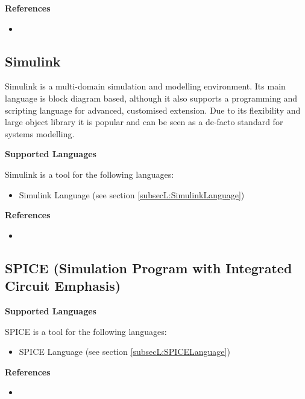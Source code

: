 \textbf{References}
\begin{itemize}
	
\item {}
\end{itemize}



\subsection{Simulink}
\label{subsecT:Simulink}


Simulink is a multi-domain simulation and modelling environment. Its main language is block diagram based, although it also supports a programming and scripting language for advanced, customised extension. Due to its flexibility and large object library it is popular and can be seen as a de-facto standard for systems modelling.

\textbf{Supported Languages}

Simulink is a tool for the following languages:
\begin{itemize}
	\item Simulink Language (see section \ref{subsecL:SimulinkLanguage})
\end{itemize}


\textbf{References}
\begin{itemize}
	
\item {}
\end{itemize}



\subsection{SPICE (Simulation Program with Integrated Circuit Emphasis)}
\label{subsecT:SPICE}



\textbf{Supported Languages}

SPICE is a tool for the following languages:
\begin{itemize}
	\item SPICE Language (see section \ref{subsecL:SPICELanguage})
\end{itemize}


\textbf{References}
\begin{itemize}
	
\item {}
\end{itemize}



